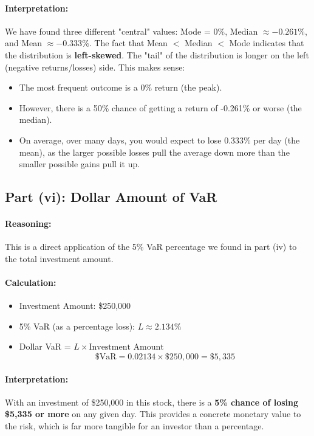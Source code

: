 \documentclass[11pt,a4paper]{article}
\begin{document}
\paragraph{Interpretation:}
We have found three different "central" values: Mode = 0\%, Median $\approx -0.261\%$, and Mean $\approx -0.333\%$.
The fact that Mean $<$ Median $<$ Mode indicates that the distribution is \textbf{left-skewed}. The "tail" of the distribution is longer on the left (negative returns/losses) side. This makes sense:
\begin{itemize}
    \item The most frequent outcome is a 0\% return (the peak).
    \item However, there is a 50\% chance of getting a return of -0.261\% or worse (the median).
    \item On average, over many days, you would expect to lose 0.333\% per day (the mean), as the larger possible losses pull the average down more than the smaller possible gains pull it up.
\end{itemize}

\subsection{Part (vi): Dollar Amount of VaR}
\paragraph{Reasoning:}
This is a direct application of the 5\% VaR percentage we found in part (iv) to the total investment amount.

\paragraph{Calculation:}
\begin{itemize}
    \item Investment Amount: \$250,000
    \item 5\% VaR (as a percentage loss): $L \approx 2.134\%$
    \item Dollar VaR = $L \times \text{Investment Amount}$
    \[ \$ \text{VaR} = 0.02134 \times \$250,000 = \$5,335 \]
\end{itemize}
\paragraph{Interpretation:}
With an investment of \$250,000 in this stock, there is a \textbf{5\% chance of losing \$5,335 or more} on any given day. This provides a concrete monetary value to the risk, which is far more tangible for an investor than a percentage.
\end{document}
